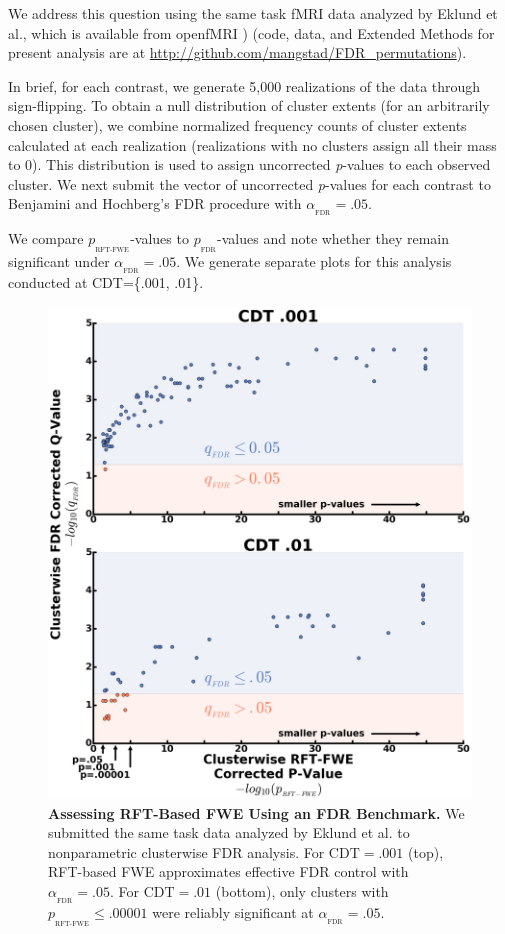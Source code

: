 \documentclass[9pt,twocolumn,twoside]{pnas-new}
\newcommand{\subtext}[2]{
#1_{_{\text{#2}}}
}
\begin{document}
We address this question using the same task fMRI data \cite{duncan_consistency_2009,tom_neural_2007} analyzed by Eklund et al., which is available from openfMRI \cite{poldrack_toward_2013})  (code, data, and Extended Methods for present analysis are at \url{http://github.com/mangstad/FDR_permutations}).

In brief, for each contrast, we generate 5,000 realizations of the data through sign-flipping. 
To obtain a null distribution of cluster extents (for an arbitrarily chosen cluster), we combine normalized frequency counts of cluster extents calculated at each realization (realizations with no clusters assign all their mass to 0). 
This distribution is used to assign uncorrected \textit{p}-values to each observed cluster. 
We next submit the vector of uncorrected \textit{p}-values for each contrast to Benjamini and Hochberg's \cite{fdr} FDR procedure with $\subtext{\alpha}{FDR}=.05$.
 
We compare $\subtext{p}{RFT-FWE}$-values to $\subtext{p}{FDR}$-values and note whether they remain significant under $\subtext{\alpha}{FDR}=.05$. 
We generate separate plots for this analysis conducted at CDT=\{.001, .01\}.

\begin{figure}[ht]
\includegraphics[width=1.0\textwidth]{../Results/FDR_surviving_clusters.png}
\centering
\caption{
\textbf{Assessing RFT-Based FWE Using an FDR Benchmark.}
We submitted the same task data analyzed by Eklund et al. to nonparametric clusterwise FDR analysis. For $\text{CDT}=.001$ (top), RFT-based FWE approximates effective FDR control with $\subtext{\alpha}{FDR} = .05$. For $\text{CDT}=.01$ (bottom), only clusters with $\subtext{p}{RFT-FWE} \leq .00001$ were reliably significant at $\subtext{\alpha}{FDR}=.05$. 
\label{fig:p-plot}
}
\end{figure} 
\end{document}
